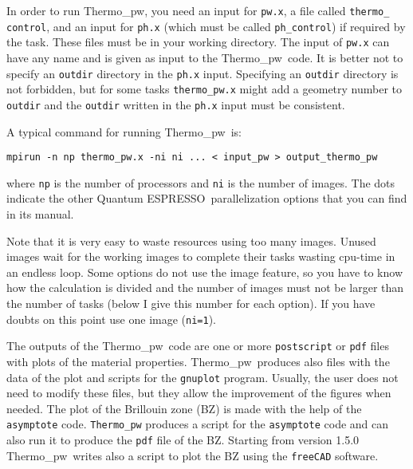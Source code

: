 \documentclass[12pt,a4paper,twoside]{report}
\def\qe{{\sc Quantum ESPRESSO}}
\def\thermo{{\sc Thermo\_pw}}
\begin{document}
In order to run \thermo, you need an input for \texttt{pw.x},  
a file called \texttt{thermo\_} \texttt{control}, and an input for 
\texttt{ph.x}
(which must be called \texttt{ph\_control}) if required by the task.
 These files must be in your working
directory.
The input of \texttt{pw.x} can have any name and is given as input to
the \thermo\ code. It is better not to specify an \texttt{outdir} 
directory in the \texttt{ph.x} input. Specifying an \texttt{outdir}
directory is not forbidden, but for some tasks \texttt{thermo\_pw.x} 
might add a geometry number to \texttt{outdir} and the
\texttt{outdir} written in the \texttt{ph.x} input must be consistent.

A typical command for running \thermo\ is:

\begin{verbatim}
mpirun -n np thermo_pw.x -ni ni ... < input_pw > output_thermo_pw
\end{verbatim}

where \texttt{np} is the number of processors and \texttt{ni} is the number 
of images. The dots indicate the other \qe\ parallelization options that
you can find in its manual.

Note that it is very easy to waste resources using too many 
images. Unused images wait for the working images to complete
their tasks wasting cpu-time in an endless loop. 
Some options 
do not use the image feature, so you have to know how the calculation 
is divided and the number of images must not
be larger than the number of tasks (below I give this number for each option).
If you have doubts on this point use one image 
(\texttt{ni=1}).

The outputs of the \thermo\ code are one or more \texttt{postscript} or
\texttt{pdf} files 
with plots of the material properties. \thermo\ produces also files with 
the data of 
the plot and scripts for the \texttt{gnuplot} program. 
Usually, the user does not need to modify these files, but they allow 
the improvement of the figures when needed.
The plot of the Brillouin zone (BZ) is made with the help of the 
\texttt{asymptote} code. \texttt{Thermo\_pw} produces a script 
for the \texttt{asymptote} code and can also run it to produce the \texttt{pdf}
file of the BZ. Starting from version 1.5.0 \thermo\ writes also a 
script to plot the BZ using the \texttt{freeCAD} software.

\newpage
\end{document}
